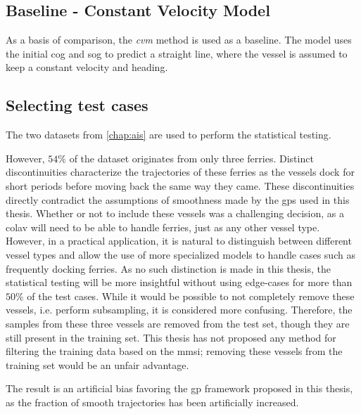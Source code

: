 \subsection{Baseline - Constant Velocity Model}
As a basis of comparison, the \textit{\acrfull{cvm}} method is used as a baseline. The model uses the initial \acrshort{cog} and \acrshort{sog} to predict a straight line, where the vessel is assumed to keep a constant velocity and heading.

\subsection{Selecting test cases}
The two datasets from \cref{chap:ais} are used to perform the statistical testing.

However, $54\%$ of the dataset originates from only three ferries. Distinct discontinuities characterize the trajectories of these ferries as the vessels dock for short periods before moving back the same way they came. These discontinuities directly contradict the assumptions of smoothness made by the \acrshort{gp}s used in this thesis. Whether or not to include these vessels was a challenging decision, as a \acrshort{colav} will need to be able to handle ferries, just as any other vessel type. However, in a practical application, it is natural to distinguish between different vessel types and allow the use of more specialized models to handle cases such as frequently docking ferries. As no such distinction is made in this thesis, the statistical testing will be more insightful without using edge-cases for more than $50\%$ of the test cases. While it would be possible to not completely remove these vessels, i.e. perform subsampling, it is considered more confusing. Therefore, the samples from these three vessels are removed from the test set, though they are still present in the training set. This thesis has not proposed any method for filtering the training data based on the \acrshort{mmsi}; removing these vessels from the training set would be an unfair advantage.

The result is an artificial bias favoring the \acrshort{gp} framework proposed in this thesis, as the fraction of smooth trajectories has been artificially increased.

